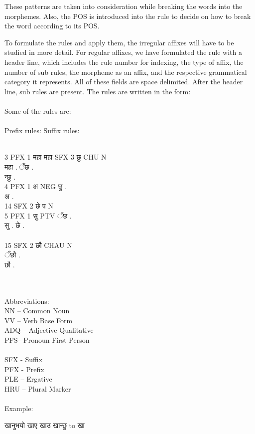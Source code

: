 \documentclass[conference]{IEEEtran}
\begin{document}
These patterns are taken into consideration while breaking the words into the
morphemes. Also, the POS is introduced into the rule to decide on how to break
the word according to its POS.

To formulate the rules and apply
them, the irregular affixes will have to be studied in
more detail. For regular affixes, we have formulated
the rule with a header line, which includes the rule
number for indexing, the type of affix, the number of
sub rules, the morpheme as an affix, and the respective
grammatical category it represents. All of these fields
are space delimited. After the header line, sub rules are
present. 
The rules are written in the form:\\
\\

Some of the rules are:\\\\
Prefix rules: \qquad \qquad Suffix rules:\\\\
\begin{sanskrit}
3 PFX 1 महा महा \qquad {} SFX 3 छु CHU N\\
महा .\hspace{80pt} ँछ .\\
\phantom{x}\hspace{96pt} न्छु .\\
4 PFX 1 अ NEG \hspace{40pt}छु .\\
अ .\\
\phantom{x}\hspace{96pt}14 SFX 2 छे प N\\
5 PFX 1 सु PTV\hspace{35pt} ँछ .\\
सु .\hspace{88pt} छे .\\\\
\phantom{x}\hspace{96pt}15 SFX 2 छौ CHAU N\\
\phantom{x}\hspace{96pt}ँछौ .\\
\phantom{x}\hspace{96pt}छौ .
\end{sanskrit}\\\\
Abbreviations:\\ 
NN – Common Noun\\
VV – Verb Base Form
\\
ADQ – Adjective Qualitative\\
PFS– Pronoun First Person\\\\
SFX - Suffix\\
PFX - Prefix\\
PLE – Ergative\\
HRU – Plural Marker\\\\
Example: \begin{sanskrit} खानुभयो खाए खाउ खान्छु to खा  \end{sanskrit}
\end{document}
